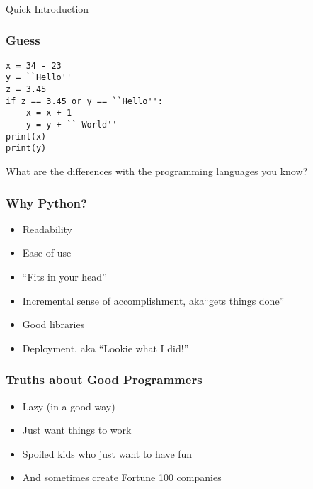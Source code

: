 \begin{frame}[fragile]\frametitle{}
\begin{center}
{\Large Quick Introduction}
\end{center}
\end{frame}


\begin{frame}[fragile]\frametitle{Guess}
\begin{lstlisting}
x = 34 - 23            
y = ``Hello''        
z = 3.45    
if z == 3.45 or y == ``Hello'':
	x = x + 1
	y = y + `` World''
print(x)
print(y)
\end{lstlisting}
What are the differences with the programming languages you know?
\end{frame}

\begin{frame} \frametitle{Why Python?}
\begin{itemize}
\item  Readability
\item Ease of use
\item ``Fits in your head''
\item Incremental sense of accomplishment, aka``gets things done''
\item Good libraries
\item Deployment, aka ``Lookie what I did!''
\end{itemize}
\end{frame}

\begin{frame}[fragile]\frametitle{Truths about Good Programmers}
    \begin{itemize}
    \item Lazy (in a good way)
    \item Just want things to work
    \item Spoiled kids who just want to have fun
    \item And sometimes create Fortune 100 companies
    \end{itemize}
\end{frame}

